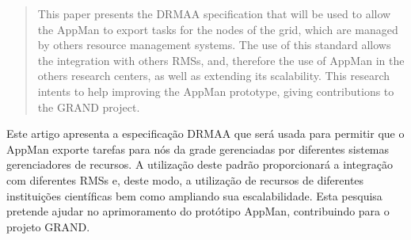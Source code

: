 \begin{abstract}
This paper presents the DRMAA specification that will be used to allow the AppMan to export tasks for the nodes of the grid, which are managed by others resource management systems. The use of this standard allows the integration with others RMSs, and, therefore the use of AppMan in the others research centers, as well as extending its scalability. This research intents to help improving the AppMan prototype, giving contributions to the GRAND project.
\end{abstract}

\begin{resumo}
Este artigo apresenta a especificação DRMAA que será usada para permitir que o AppMan exporte tarefas para nós da grade gerenciadas por diferentes sistemas gerenciadores de recursos. A utilização deste padrão proporcionará a integração com diferentes RMSs e, deste modo, a utilização de recursos de diferentes instituições científicas bem como ampliando sua escalabilidade. Esta pesquisa pretende ajudar no aprimoramento do protótipo AppMan, contribuindo para o projeto GRAND.
\end{resumo}

